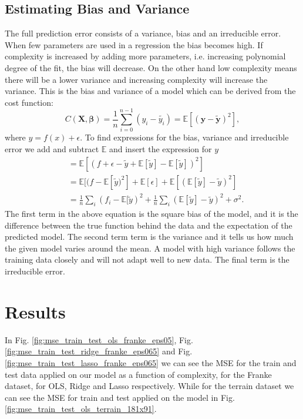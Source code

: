 \documentclass[%
 reprint,
nofootinbib,
 amsmath,amssymb,
 aps,
]{revtex4-2}
\begin{document}
\subsection{Estimating Bias and Variance}
The full prediction error consists of a variance, bias and an irreducible error. When few parameters are used in a regression the bias becomes high. If complexity is increased by adding more parameters, i.e. increasing polynomial degree of the fit, the bias will decrease. On the other hand low complexity means there will be a lower variance and increasing complexity will increase the variance. This is the bias and variance of a model which can be derived from the cost function:
%
\begin{equation*}
   C(\boldsymbol{X}, \boldsymbol{\beta}) = \frac{1}{n} \sum_{i=0}^{n-1} (y_i - \tilde{y_i}) =  \mathbb{E}[(\boldsymbol{y} - \boldsymbol{\tilde{y}})^2],
\end{equation*}
%
where $y = f(x) + \epsilon$. To find expressions for the bias, variance and irreducible error we add and subtract $\mathbb{E}$ and insert the expression for $y$
%
\begin{align*}
    &=\mathbb{E}[(f + \epsilon - \tilde{y} + \mathbb{E}[\tilde{y}] - \mathbb{E}[\tilde{y}])^2]\\
    &= \mathbb{E}[(f - \mathbb{E}[\tilde{y})^2] + \mathbb{E}[\epsilon] + \mathbb{E}[(\mathbb{E}[\tilde{y}] - \tilde{y})^2]\\
    &=\frac{1}{n}\sum_i (f_i - \mathbb{E}[\tilde{y})^2 + \frac{1}{n}\sum_i (\mathbb{E}[\tilde{y}] - \tilde{y})^2 + \sigma^2.
\end{align*}
%
The first term in the above equation is the square bias of the model, and it is the difference between the true function behind the data and the expectation of the predicted model. The second term term is the variance and it tells us how much the given model varies around the mean. A model with high variance follows the training data closely and will not adapt well to new data. The final term is the irreducible error.
%


\section{Results}\label{sec:results}
In Fig. \ref{fig:mse_train_test_ols_franke_eps05}, Fig. \ref{fig:mse_train_test_ridge_franke_eps065} and Fig. \ref{fig:mse_train_test_lasso_franke_eps065} we can see the MSE for the train and test data applied on our model as a function of complexity, for the Franke dataset, for OLS, Ridge and Lasso respectively. While for the terrain dataset we can see the MSE for train and test applied on the model in Fig. \ref{fig:mse_train_test_ols_terrain_181x91}.
\end{document}

